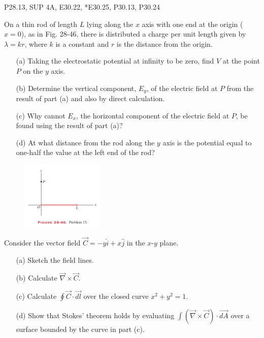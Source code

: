 \documentclass[11pt,letterpaper,boxed]{pset}
\begin{document}
    \begin{center}
        P28.13, SUP 4A, E30.22, *E30.25, P30.13, P30.24

    \end{center}
    
    \begin{problem} [P28.13]
    On a thin rod of length $L$ lying along the $x$ axis with one end at the origin ($x=0$), as in Fig. 28-46, there is distributed a charge per unit length given by $\lambda=kr$, where $k$ is a constant and $r$ is the distance from the origin. 
    
    \begin{itemize}
        \item [(a)] Taking the electrostatic potential at infinity to be zero, find $V$ at the point $P$ on the $y$ axis. 
        \item [(b)] Determine the vertical component, $E_y$, of the electric field at $P$ from the result of part (a) and also by direct calculation.
        \item [(c)] Why cannot $E_x$, the horizontal component of the electric field at $P$, be found using the result of part (a)?
        \item [(d)] At what distance from the rod along the $y$ axis is the potential equal to one-half the value at the left end of the rod?
    \end{itemize}
    \end{problem}
    \begin{figure} [ht]
        \includegraphics[width=150px]{HW4Images/P28-13.png}
        \label{fig:P28-13}
    \end{figure}
    \newpage
    
    \begin{problem} [SUP 4A]
    Consider the vector field $\Vec{C}=-y\hat{i}+x\hat{j}$ in the $x$-$y$ plane.
    
    \begin{itemize} 
        \item [(a)] Sketch the field lines.
        \item [(b)] Calculate $\Vec{\nabla} \times \Vec{C}$.
        \item [(c)] Calculate $\oint \Vec{C} \cdot \Vec{dl}$ over the closed curve $x^2+y^2=1$.
        \item [(d)] Show that Stokes' theorem holds by evaluating $\int (\Vec{\nabla} \times \Vec{C}) \cdot \Vec{dA}$ over a surface bounded by the curve in part (c).
    \end{itemize}
    \end{problem}
    \newpage
    
\end{document}
